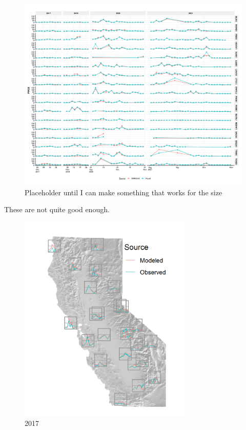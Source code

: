 \documentclass[gmd, manuscript]{copernicus}
\begin{document}
\begin{figure}
\includegraphics[width=12cm]{./Figures/ImpTimeSeries} \caption{Placeholder until I can make something that works for the size}\label{fig:unnamed-chunk-1}
\end{figure}

These are not quite good enough.

\begin{figure}
\includegraphics[width=8.3cm]{./Figures/Spark2017_GMD} \caption{2017}\label{fig:unnamed-chunk-2}
\end{figure}
\end{document}
